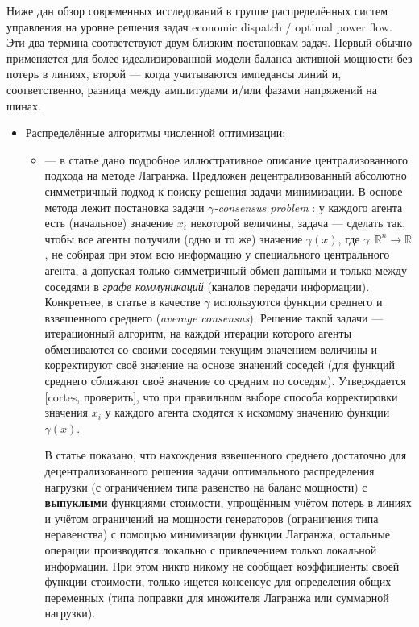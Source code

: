 \documentclass{report}
\def \R {\mathbb{R}}
\begin{document}
Ниже дан обзор современных исследований в группе распределённых систем управления на уровне решения задач economic dispatch / optimal power flow. 
Эти два термина соответствуют двум близким постановкам задач. 
Первый обычно применяется для более идеализированной модели баланса активной мощности без потерь в линиях, второй --- когда учитываются импедансы линий и, соответственно, разница между амплитудами и/или фазами напряжений на шинах. 
\begin{itemize}
\item Распределённые алгоритмы численной оптимизации:
\begin{itemize}
\item \cite{loia2013decentralized} --- в статье дано подробное иллюстративное описание централизованного подхода на методе Лагранжа. 
Предложен децентрализованный абсолютно симметричный подход к поиску решения задачи минимизации.
В основе метода лежит постановка задачи \textit{$\gamma$-consensus problem} : у каждого агента есть (начальное) значение $x_i$ некоторой величины, задача ---  сделать так, чтобы все агенты получили (одно и то же) значение $\gamma(x)$, где $\gamma :\R^n \rightarrow \R$ , не собирая при этом всю информацию у специального центрального агента, а допуская только симметричный обмен данными и только между соседями в \textit{графе коммуникаций} (каналов передачи информации).
Конкретнее, в статье в качестве $\gamma$ используются функции среднего и взвешенного среднего (\textit{average consensus}).
Решение такой задачи --- итерационный алгоритм, на каждой итерации которого агенты обмениваются со своими соседями текущим значением величины и корректируют своё значение на основе значений соседей (для функций среднего сближают своё значение со средним по соседям).
Утверждается [cortes, проверить], что при правильном выборе способа корректировки значения $x_i$ у каждого агента сходятся к искомому значению функции $\gamma(x)$.

В статье показано, что нахождения взвешенного среднего достаточно для децентрализованного решения задачи оптимального распределения нагрузки (с ограничением типа равенство на баланс мощности) с \textbf{выпуклыми} функциями стоимости, упрощённым учётом потерь в линиях и учётом ограничений на мощности генераторов (ограничения типа неравенства) с помощью минимизации функции Лагранжа, остальные операции производятся локально с привлечением только локальной информации.
При этом никто никому не сообщает коэффициенты своей функции стоимости, только ищется консенсус для определения общих переменных (типа поправки для множителя Лагранжа или суммарной нагрузки).


\end{itemize}
\end{itemize}
\end{document}
